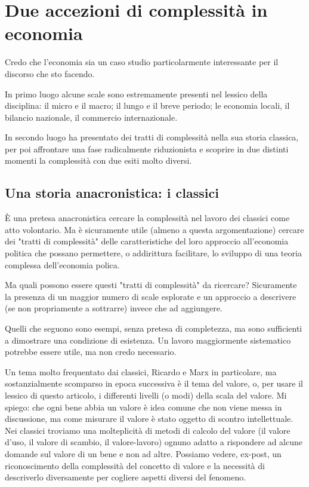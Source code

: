 \documentclass[a4paper, headings=standardclasses]{scrartcl}
\begin{document}
\section{Due accezioni di complessità in economia}
Credo che l'economia sia un caso studio particolarmente interessante per il discorso che sto facendo.

In primo luogo alcune scale sono estremamente presenti nel lessico della disciplina: il micro e il macro; il lungo e il breve periodo; le economia locali, il bilancio nazionale, il commercio internazionale.

In secondo luogo ha presentato dei tratti di complessità nella sua storia classica, per poi affrontare una fase radicalmente riduzionista e scoprire in due distinti momenti la complessità con due esiti molto diversi.

\subsection{Una storia anacronistica: i classici}
È una pretesa anacronistica cercare la complessità nel lavoro dei classici come atto volontario. Ma è sicuramente utile (almeno a questa argomentazione) cercare dei "tratti di complessità" delle caratteristiche del loro approccio all'economia politica che possano permettere, o addirittura facilitare, lo sviluppo di una teoria complessa dell'economia polica.

Ma quali possono essere questi "tratti di complessità" da ricercare? Sicuramente la presenza di un maggior numero di scale esplorate e un approccio a descrivere (se non propriamente a sottrarre) invece che ad aggiungere.

Quelli che seguono sono esempi, senza pretesa di completezza, ma sono sufficienti a dimostrare una condizione di esistenza. Un lavoro maggiormente sistematico potrebbe essere utile, ma non credo necessario.

Un tema molto frequentato dai classici, Ricardo e Marx in particolare, ma sostanzialmente scomparso in epoca successiva è il tema del valore, o, per usare il lessico di questo articolo, i differenti livelli (o modi) della scala del valore. Mi spiego: che ogni bene abbia un valore è idea comune che non viene messa in discussione, ma come misurare il valore è stato oggetto di scontro intellettuale. Nei classici troviamo una molteplicità di metodi di calcolo del valore (il valore d'uso, il valore di scambio, il valore-lavoro) ognuno adatto a rispondere ad alcune domande sul valore di un bene e non ad altre. Possiamo vedere, ex-post, un riconoscimento della complessità del concetto di valore e la necessità di descriverlo diversamente per cogliere aspetti diversi del fenomeno.
\end{document}

